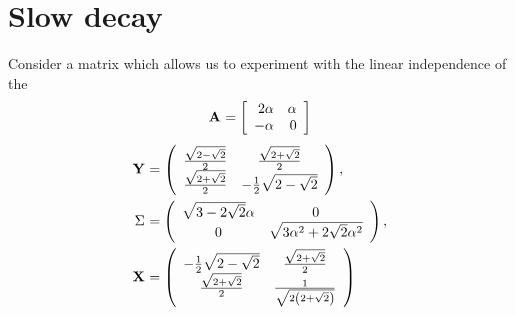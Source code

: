 \section{Slow decay}
Consider a matrix which allows us to experiment with the linear independence of the
\begin{equation}
  \A{} = \mat{rr}{2\alpha & \alpha \\ -\alpha & 0 }
\end{equation}
\begin{equation}
  \begin{split}
    \Y{} & = 
\left(
\begin{array}{cc}
 \frac{\sqrt{2-\sqrt{2}}}{2} & \frac{\sqrt{2+\sqrt{2}}}{2} \\
 \frac{\sqrt{2+\sqrt{2}}}{2} & -\frac{1}{2} \sqrt{2-\sqrt{2}}
\end{array}
\right), \\
   \sig{} & =
\left(
\begin{array}{cc}
 \sqrt{3-2 \sqrt{2}} \alpha  & 0 \\
 0 & \sqrt{3 \alpha ^2+2 \sqrt{2} \alpha ^2}
\end{array}
\right), \\
   \X{} &=
\left(
\begin{array}{cc}
 -\frac{1}{2} \sqrt{2-\sqrt{2}} & \frac{\sqrt{2+\sqrt{2}}}{2} \\
 \frac{\sqrt{2+\sqrt{2}}}{2} & \frac{1}{\sqrt{2 \left(2+\sqrt{2}\right)}}
\end{array}
\right)
  \end{split}
\end{equation}

 


\endinput